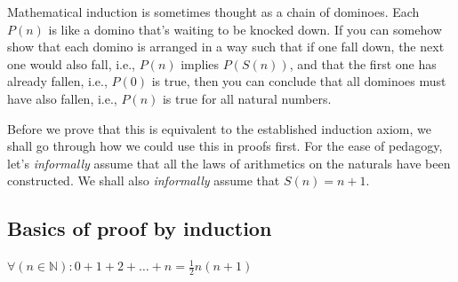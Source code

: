 Mathematical induction is sometimes thought as a chain of dominoes. Each \(P(n)\) is like a domino
that's waiting to be knocked down. If you can somehow show that each domino is arranged in a way
such that if one fall down, the next one would also fall, i.e., \(P(n)\) implies \(P(S(n))\), and
that the first one has already fallen, i.e., \(P(0)\) is true, then you can conclude that all
dominoes must have also fallen, i.e., \(P(n)\) is true for all natural numbers.

Before we prove that this is equivalent to the established induction axiom, we shall go through how
we could use this in proofs first. For the ease of pedagogy, let's \emph{informally} assume that all
the laws of arithmetics on the naturals have been constructed. We shall also \emph{informally}
assume that \(S(n) = n + 1\).

\subsection{Basics of proof by induction}

\begin{prop}{}{}
  \(\forall (n \in \mathbb{N}) : 0 + 1 + 2 + \dots + n = \frac{1}{2} n (n + 1)\)
\end{prop}

